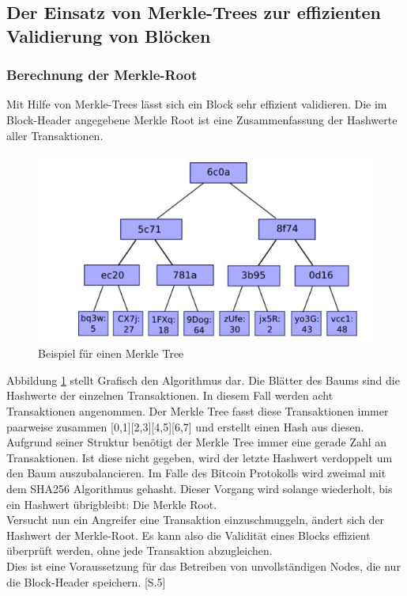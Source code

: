 \subsection{Der Einsatz von Merkle-Trees zur effizienten Validierung von Blöcken}
\subsubsection{Berechnung der Merkle-Root}
Mit Hilfe von Merkle-Trees lässt sich ein Block sehr effizient validieren. Die im Block-Header angegebene Merkle Root ist eine Zusammenfassung der Hashwerte aller Transaktionen.

\begin{figure}[ht]
	\centering
	\includegraphics[scale=0.75]{grafiken/merkle_tree.png}
	\caption{Beispiel für einen Merkle Tree \cite{Buterin.2014}}
	\label{Beispiel für einen Merkle Tree}
\end{figure}

Abbildung \ref{Beispiel für einen Merkle Tree} stellt Grafisch den Algorithmus dar. Die Blätter des Baums sind die Hashwerte der einzelnen Transaktionen. In diesem Fall werden acht Transaktionen angenommen. Der Merkle Tree fasst diese Transaktionen immer paarweise zusammen [0,1][2,3][4,5][6,7] und erstellt einen Hash aus diesen. Aufgrund seiner Struktur benötigt der Merkle Tree immer eine gerade Zahl an Transaktionen. Ist diese nicht gegeben, wird der letzte Hashwert verdoppelt um den Baum auszubalancieren. Im Falle des Bitcoin Protokolls wird zweimal mit dem SHA256 Algorithmus gehasht. Dieser Vorgang wird solange wiederholt, bis ein Hashwert übrigbleibt: Die Merkle Root.\\
Versucht nun ein Angreifer eine Transaktion \glqq einzuschmuggeln\grqq{}, ändert sich der Hashwert der Merkle-Root. Es kann also die Validität eines Blocks effizient überprüft werden, ohne jede Transaktion abzugleichen.\\
Dies ist eine Voraussetzung für das Betreiben von unvollständigen Nodes, die nur die Block-Header speichern. \cite{Nakamoto.31.10.2008}[S.5]

